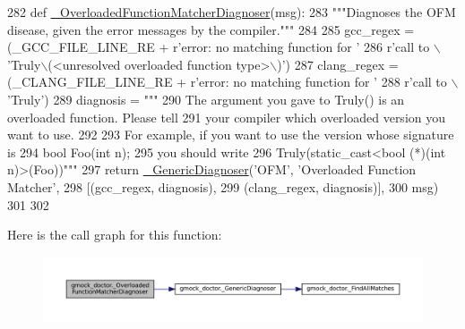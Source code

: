 \begin{DoxyCode}
282 \textcolor{keyword}{def }\hyperlink{namespacegmock__doctor_a82934d9b43f75ab1112a9436c1a31068}{\_OverloadedFunctionMatcherDiagnoser}(msg):
283   \textcolor{stringliteral}{"""Diagnoses the OFM disease, given the error messages by the compiler."""}
284 
285   gcc\_regex = (\_GCC\_FILE\_LINE\_RE + \textcolor{stringliteral}{r'error: no matching function for '}
286                \textcolor{stringliteral}{r'call to \(\backslash\)'Truly\(\backslash\)(<unresolved overloaded function type>\(\backslash\))'})
287   clang\_regex = (\_CLANG\_FILE\_LINE\_RE + \textcolor{stringliteral}{r'error: no matching function for '}
288                  \textcolor{stringliteral}{r'call to \(\backslash\)'Truly'})
289   diagnosis = \textcolor{stringliteral}{"""}
290 \textcolor{stringliteral}{The argument you gave to Truly() is an overloaded function.  Please tell}
291 \textcolor{stringliteral}{your compiler which overloaded version you want to use.}
292 \textcolor{stringliteral}{}
293 \textcolor{stringliteral}{For example, if you want to use the version whose signature is}
294 \textcolor{stringliteral}{  bool Foo(int n);}
295 \textcolor{stringliteral}{you should write}
296 \textcolor{stringliteral}{  Truly(static\_cast<bool (*)(int n)>(Foo))"""}
297   \textcolor{keywordflow}{return} \hyperlink{namespacegmock__doctor_af5023d3e12d1f4a7171c6b035783de84}{\_GenericDiagnoser}(\textcolor{stringliteral}{'OFM'}, \textcolor{stringliteral}{'Overloaded Function Matcher'},
298                            [(gcc\_regex, diagnosis),
299                             (clang\_regex, diagnosis)],
300                            msg)
301 
302 
\end{DoxyCode}
Here is the call graph for this function\+:
\nopagebreak
\begin{figure}[H]
\begin{center}
\leavevmode
\includegraphics[width=350pt]{namespacegmock__doctor_a82934d9b43f75ab1112a9436c1a31068_cgraph}
\end{center}
\end{figure}
\mbox{\label{namespacegmock__doctor_a830bf3bac2d58666d82a75dfa0865c42}} 
